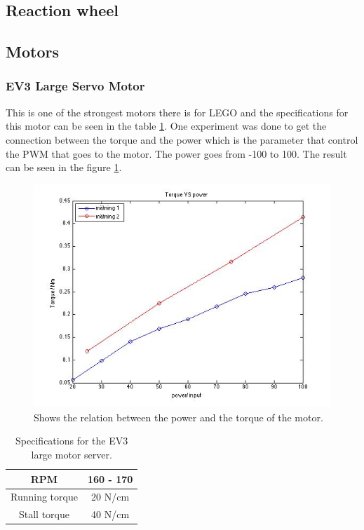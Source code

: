 \documentclass[a4paper]{article}
\begin{document}
        
        
    \newpage 
    \subsection{Reaction wheel}
    
    
    
    
    \newpage
    \subsection{Motors}
    	\subsubsection{EV3 Large Servo Motor}
	This is one of the strongest motors there is for LEGO and the specifications for this motor can be seen in the table \ref{table:EV3_Large_servo_motor}. One experiment was done to get the connection between the torque and the power which is the parameter that control the PWM that goes to the motor. The power goes from -100 to 100. The result can be seen in the figure \ref{fig:plot_power_torque}.
	\cite{kinaSUR}
    
       \begin{figure}[h]
		\centering
		\includegraphics[width=1.3\textwidth]{plot_torque_versus_power_20151207}
		\caption{Shows the relation between the power and the torque of the motor.}
		\label{fig:plot_power_torque}
	\end{figure}
	
	\begin{table}[h]
		\center
		\begin{tabular}{|c |c|}
			\hline
			 RPM &  160 - 170  \\ 
			\hline
			Running torque &  20 N/cm  \\ 
			\hline
			Stall torque  &  40 N/cm   \\
			\hline
		\end{tabular}
		\caption{Specifications for the EV3 large motor server.}
		\label{table:EV3_Large_servo_motor}
	\end{table}
	
\end{document}
